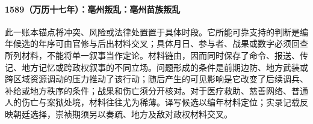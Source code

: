 \paragraph{1589（万历十七年）：亳州叛乱：亳州苗族叛乱} 此一账本锚点将冲突、风险或法律处置置于具体时段。它所能可靠支持的判断是编年候选的年序可由官修与后出材料交叉；具体月日、参与者、战果或数字必须回查所列材料，不能将单一叙事当作定论。材料链由，因而同时保存了命令、报送、传记、地方记忆或跨政权叙事的不同立场。问题形成的条件是前期边防、地方武装或跨区域资源调动的压力推动了该行动；随后产生的可见影响是它改变了后续调兵、补给或地方秩序的条件；战果和伤亡须分开核对。对于医疗救助、慈善网络、普通人的伤亡与案狱处境，材料往往尤为稀薄。译写候选以编年材料定位；实录记载反映朝廷选择，崇祯期须另以奏疏、地方及敌对政权材料交叉。
